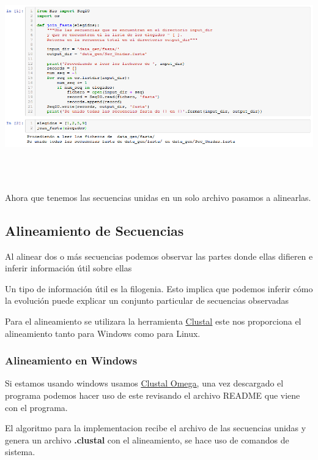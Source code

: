 \documentclass[a4paper]{article}
\begin{document}
\begin{center}
	\includegraphics[width=16cm,height=9cm]{join_Fasta.png}
\end{center}

Ahora que tenemos las secuencias unidas en un solo archivo pasamos a alinearlas.

\subsection{Alineamiento de Secuencias}

\noindent Al alinear dos o más secuencias podemos observar las partes donde ellas difieren e inferir información útil sobre ellas

\noindent Un tipo de información útil es la filogenia. Esto implica que podemos inferir cómo la evolución puede explicar un conjunto particular de secuencias observadas

Para el alineamiento se utilizara la herramienta \href{http://www.clustal.org/}{\underline{Clustal}} este nos proporciona el alineamiento tanto para Windows como para Linux.

\subsubsection{Alineamiento en Windows}
Si estamos usando windows usamos \href{http://www.clustal.org/omega/}{\underline{Clustal Omega}}, una vez descargado el programa podemos hacer uso de este revisando el archivo README que viene con el programa.
  
\noindent El algoritmo para la implementacion recibe el archivo de las secuencias unidas y genera un archivo \textbf{.clustal} con el alineamiento, se hace uso de comandos de sistema. \\
\end{document}
